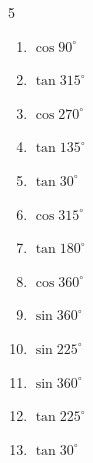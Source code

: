 \begin{multicols}{5}
\begin{enumerate}
  \item $\displaystyle \cos{90^\circ}$

        \phantom{$\displaystyle =0$}

  \item $\displaystyle \tan{315^\circ}$

        \phantom{$\displaystyle =-1$}

\columnbreak %

\resetques

  \item $\displaystyle \cos{270^\circ}$

        \phantom{$\displaystyle =0$}

  \item $\displaystyle \tan{135^\circ}$

        \phantom{$\displaystyle =-1$}

  \item $\displaystyle \tan{30^\circ}$


  \item $\displaystyle \cos{315^\circ}$


  \item $\displaystyle \tan{180^\circ}$

        \phantom{$\displaystyle =0$}

  \item $\displaystyle \cos{360^\circ}$

        \phantom{$\displaystyle =1$}

  \item $\displaystyle \sin{360^\circ}$

        \phantom{$\displaystyle =0$}

  \item $\displaystyle \sin{225^\circ}$


  \item $\displaystyle \sin{360^\circ}$

        \phantom{$\displaystyle =0$}

  \item $\displaystyle \tan{225^\circ}$

        \phantom{$\displaystyle =1$}

  \item $\displaystyle \tan{30^\circ}$


\end{enumerate}
\end{multicols}
